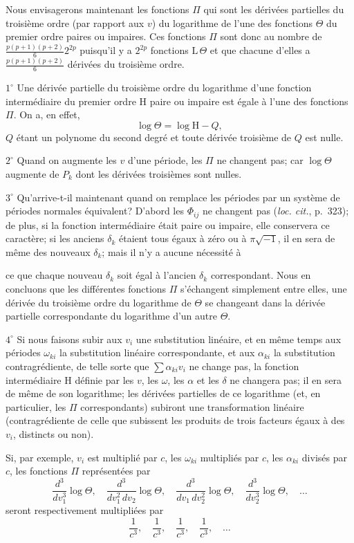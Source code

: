 \documentclass{article}
\begin{document}
Nous envisagerons maintenant les fonctions $\Pi$ qui sont les dérivées partielles du troisième ordre (par rapport aux $v$) du logarithme de l'une des fonctions $\Theta$ du premier ordre paires ou impaires. Ces fonctions $\Pi$ sont donc au nombre de $\frac{p(p+1)(p+2)}{6} 2^{2p}$ puisqu'il y a $2^{2p}$ fonctions $\mathrm{L}\,\Theta$ et que chacune d'elles a $\frac{p(p+1)(p+2)}{6}$ dérivées du troisième ordre.

$1^{\circ}$ Une dérivée partielle du troisième ordre du logarithme d'une fonction intermédiaire du premier ordre $\mathrm{H}$ paire ou impaire est égale à l'une des fonctions $\Pi$. On a, en effet,
\[
\log\Theta = \log\mathrm{H} - Q,
\]
$Q$ étant un polynome du second degré et toute dérivée troisième de $Q$ est nulle.

$2^{\circ}$ Quand on augmente les $v$ d'une période, les $\Pi$ ne changent pas; car $\log\Theta$ augmente de $P_{k}$ dont les dérivées troisièmes sont nulles.

$3^{\circ}$ Qu'arrive-t-il maintenant quand on remplace les périodes par un système de périodes normales équivalent? D'abord les $\Phi_{ij}$ ne changent pas (\emph{loc. cit.}, p.~323); de plus, si la fonction intermédiaire était paire ou impaire, elle conservera ce caractère; si les anciens $\delta_{k}$ étaient tous égaux à zéro ou à $\pi\sqrt{-1}$, il en sera de même des nouveaux $\delta_{k}$; mais il n'y a aucune nécessité à

ce que chaque nouveau $\delta_{k}$ soit égal à l'ancien $\delta_{k}$ correspondant. Nous en concluons que les différentes fonctions $\Pi$ s'échangent simplement entre elles, une dérivée du troisième ordre du logarithme de $\Theta$ se changeant dans la dérivée partielle correspondante du logarithme d'un autre $\Theta$.

$4^{\circ}$ Si nous faisons subir aux $v_{i}$ une substitution linéaire, et en même temps aux périodes $\omega_{ki}$ la substitution linéaire correspondante, et aux $\alpha_{ki}$ la substitution contragrédiente, de telle sorte que $\displaystyle\sum \alpha_{ki} v_{i}$ ne change pas, la fonction intermédiaire $\mathrm{H}$ définie par les $v$, les $\omega$, les $\alpha$ et les $\delta$ ne changera pas; il en sera de même de son logarithme; les dérivées partielles de ce logarithme (et, en particulier, les $\Pi$ correspondants) subiront une transformation linéaire (contragrédiente de celle que subissent les produits de trois facteurs égaux à des $v_{i}$, distincts ou non).

Si, par exemple, $v_{i}$ est multiplié par $c$, les $\omega_{ki}$ multipliés par $c$, les $\alpha_{ki}$ divisés par $c$, les fonctions $\Pi$ représentées par
\[
\frac{d^{3}}{dv_{1}^{3}} \log\Theta, \quad \frac{d^{3}}{dv_{1}^{2}\,dv_{2}} \log\Theta, \quad \frac{d^{3}}{dv_{1}\,dv_{2}^{2}} \log\Theta, \quad \frac{d^{3}}{dv_{2}^{3}} \log\Theta, \quad \ldots
\]
seront respectivement multipliées par
\[
\frac{1}{c^{3}}, \quad \frac{1}{c^{3}}, \quad \frac{1}{c^{3}}, \quad \frac{1}{c^{3}}, \quad \ldots
\]
\end{document}

